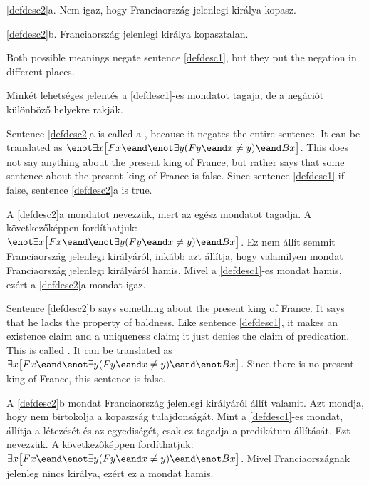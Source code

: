 \begin{earg}
\item[\ref{defdesc2}a.] Nem igaz, hogy Franciaország jelenlegi királya kopasz.
\item[\ref{defdesc2}b.] Franciaország jelenlegi királya kopasztalan.
\end{earg}

Both possible meanings negate sentence \ref{defdesc1}, but they put the negation in different places.

Minkét lehetséges jelentés a \ref{defdesc1}-es mondatot tagaja, de a negációt különböző helyekre rakják.

Sentence \ref{defdesc2}a is called a , because it negates the entire sentence. It can be translated as $\enot\exists x\bigl[Fx \eand \enot\exists y(Fy \eand x\neq y) \eand Bx\bigr]$. This does not say anything about the present king of France, but rather says that some sentence about the present king of France is false. Since sentence \ref{defdesc1} if false, sentence \ref{defdesc2}a is true.

A \ref{defdesc2}a mondatot  nevezzük, mert az egész mondatot tagadja. A következőképpen fordíthatjuk: $\enot\exists x\bigl[Fx \eand \enot\exists y(Fy \eand x\neq y) \eand Bx\bigr]$. Ez nem állít semmit Franciaország jelenlegi királyáról, inkább azt állítja, hogy valamilyen mondat Franciaország jelenlegi királyáról hamis. Mivel a \ref{defdesc1}-es mondat hamis, ezért a \ref{defdesc2}a mondat igaz.

Sentence \ref{defdesc2}b says something about the present king of France. It says that he lacks the property of baldness. Like sentence \ref{defdesc1}, it makes an existence claim and a uniqueness claim; it just denies the claim of predication. This is called . It can be translated as $\exists x\bigl[Fx \eand \enot\exists y(Fy \eand x\neq y) \eand \enot Bx\bigr]$. Since there is no present king of France, this sentence is false.

A \ref{defdesc2}b mondat Franciaország jelenlegi királyáról állít valamit. Azt mondja, hogy nem birtokolja a kopaszság tulajdonságát. Mint a \ref{defdesc1}-es mondat, állítja a létezését és az egyediségét, csak ez tagadja a predikátum állítását. Ezt  nevezzük. A következőképpen fordíthatjuk: $\exists x\bigl[Fx \eand \enot\exists y(Fy \eand x\neq y) \eand \enot Bx\bigr]$. Mivel Franciaországnak jelenleg nincs királya, ezért ez a mondat hamis.

